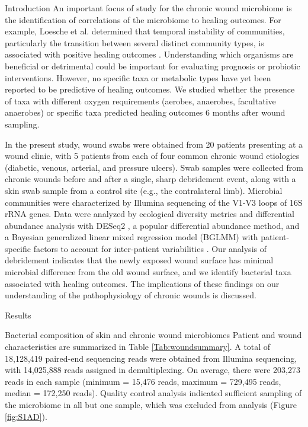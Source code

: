 \documentclass[oneside,12pt,final]{sty/ucthesis-CA2012}
\begin{document}
\begin{mainmatter}
\begin{section}{Introduction}
An important focus of study for the chronic wound microbiome is the identification of correlations of the microbiome to healing outcomes. For example, Loesche et al. determined that temporal instability of communities, particularly the transition between several distinct community types, is associated with positive healing outcomes \cite{RN7}. Understanding which organisms are beneficial or detrimental could be important for evaluating prognosis or probiotic interventions. However, no specific taxa or metabolic types have yet been reported to be predictive of healing outcomes. We studied whether the presence of taxa with different oxygen requirements (aerobes, anaerobes, facultative anaerobes) or specific taxa predicted healing outcomes 6 months after wound sampling. 

In the present study, wound swabs were obtained from 20 patients presenting at a wound clinic, with 5 patients from each of four common chronic wound etiologies (diabetic, venous, arterial, and pressure ulcers). Swab samples were collected from chronic wounds before and after a single, sharp debridement event, along with a skin swab sample from a control site (e.g., the contralateral limb). Microbial communities were characterized by Illumina sequencing of the V1-V3 loops of 16S rRNA genes. Data were analyzed by ecological diversity metrics and differential abundance analysis with DESeq2 \cite{RN32}, a popular differential abundance method, and a Bayesian generalized linear mixed regression model (BGLMM) with patient-specific factors to account for inter-patient variabilities \cite{RN33}. Our analysis of debridement indicates that the newly exposed wound surface has minimal microbial difference from the old wound surface, and we identify bacterial taxa associated with healing outcomes. The implications of these findings on our understanding of the pathophysiology of chronic wounds is discussed.
\end{section}

\begin{section}{Results}

\begin{subsection}{Bacterial composition of skin and chronic wound microbiomes}
Patient and wound characteristics are summarized in Table \ref{Tab:woundsummary}. A total of 18,128,419 paired-end sequencing reads were obtained from Illumina sequencing, with 14,025,888 reads assigned in demultiplexing. On average, there were 203,273 reads in each sample (minimum = 15,476 reads, maximum = 729,495 reads, median = 172,250 reads). Quality control analysis indicated sufficient sampling of the microbiome in all but one sample, which was excluded from analysis (Figure \ref{fig:S1AD}). 


\end{subsection}
\end{section}
\end{mainmatter}
\end{document}
